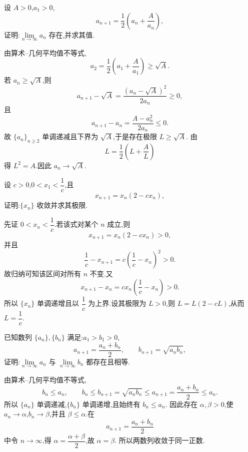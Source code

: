 \begin{example}
  设 $A>0$,$a_1>0$,
  \[
    a_{n+1}=\dfrac{1}{2}\left(a_n+\dfrac{A}{a_n}\right),
  \]
  证明:$\displaystyle \lim\limits_{n\to\infty}a_n$ 存在,并求其值.
\end{example}
\exampleblank

\begin{solution}
  由算术--几何平均值不等式,
  \[
    a_2=\dfrac{1}{2}\left(a_1+\dfrac{A}{a_1}\right)\geq\sqrt A.
  \]
  若 $a_n\geq\sqrt A$,则
  \[
    a_{n+1}-\sqrt A=\dfrac{(a_n-\sqrt A)^2}{2a_n}\geq0,
  \]
  且
  \[
    a_{n+1}-a_n=\dfrac{A-a_n^2}{2a_n}\leq0.
  \]
  故 $\{a_n\}_{n\geq2}$ 单调递减且下界为 $\sqrt A$,于是存在极限 $L\geq\sqrt A$.
  由
  \[
    L=\dfrac{1}{2}\left(L+\dfrac{A}{L}\right)
  \]
  得 $L^2=A$.因此 $a_n\to\sqrt A$.
\end{solution}

\begin{example}
  设 $c>0$,$0<x_1<\dfrac{1}{c}$,且
  \[
    x_{n+1}=x_n(2-cx_n),
  \]
  证明:$\{x_n\}$ 收敛并求其极限.
\end{example}
\exampleblank

\begin{solution}
  先证 $0<x_n<\dfrac{1}{c}$.若该式对某个 $n$ 成立,则
  \[
    x_{n+1}=x_n(2-cx_n)>0,
  \]
  并且
  \[
    \dfrac{1}{c}-x_{n+1}
    =c\left(\dfrac{1}{c}-x_n\right)^2>0.
  \]
  故归纳可知该区间对所有 $n$ 不变.又
  \[
    x_{n+1}-x_n
    =cx_n\left(\dfrac{1}{c}-x_n\right)>0.
  \]
  所以 $\{x_n\}$ 单调递增且以 $\dfrac{1}{c}$ 为上界.设其极限为 $L>0$,则
  $L=L(2-cL)$,从而 $L=\dfrac{1}{c}$.
\end{solution}

\begin{example}
  已知数列 $\{a_n\},\{b_n\}$ 满足:$a_1>b_1>0$,
  \[
    a_{n+1}=\dfrac{a_n+b_n}{2},
    \qquad
    b_{n+1}=\sqrt{a_nb_n},
  \]
  证明:$\displaystyle \lim\limits_{n\to\infty}a_n$ 与 $\displaystyle \lim\limits_{n\to\infty}b_n$ 都存在且相等.
\end{example}
\exampleblank

\begin{solution}
  由算术--几何平均值不等式,
  \[
    b_n\leq a_n,
    \qquad
    b_n\leq b_{n+1}=\sqrt{a_nb_n}\leq a_{n+1}=\dfrac{a_n+b_n}{2}\leq a_n.
  \]
  所以 $\{a_n\}$ 单调递减,$\{b_n\}$ 单调递增,且始终有 $b_n\leq a_n$.
  因此存在 $\alpha,\beta>0$,使 $a_n\to\alpha$,$b_n\to\beta$,并且
  $\beta\leq\alpha$.在
  \[
    a_{n+1}=\dfrac{a_n+b_n}{2}
  \]
  中令 $n\to\infty$,得 $\alpha=\dfrac{\alpha+\beta}{2}$,故 $\alpha=\beta$.
  所以两数列收敛于同一正数.
\end{solution}

